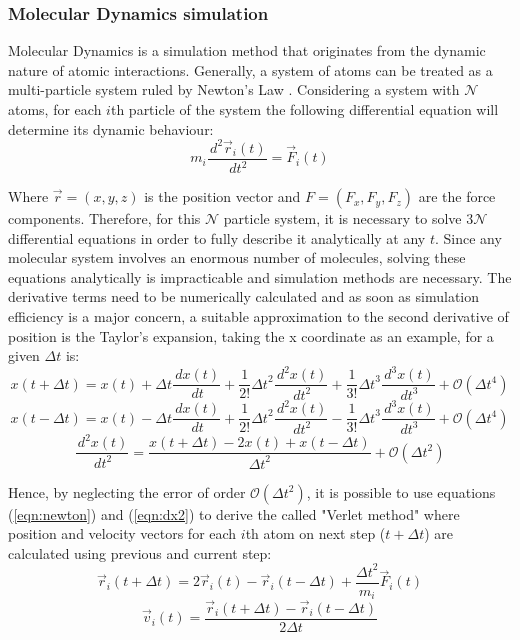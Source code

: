 \documentclass[10pt,a4paper,twoside]{article}
\begin{document}
\subsubsection{Molecular Dynamics simulation}

Molecular Dynamics is a simulation method that originates from the dynamic nature of atomic interactions. Generally, a system of atoms can be treated as a multi-particle system ruled by Newton's Law \cite{umd}. Considering a system with $\mathcal{N}$ atoms, for each $i$th particle of the system the following differential equation will determine its dynamic behaviour:
\begin{equation}
m_i\dfrac{\,d^2\vec{r}_i(t)}{\,dt^2} = \vec{F}_i(t)
\label{eqn:newton}
\end{equation}

Where $\vec{r} = (x,y,z)$ is the position vector and $F = (F_x, F_y, F_z)$ are the force components. Therefore, for this $\mathcal{N}$ particle system, it is necessary to solve $3\mathcal{N}$ differential equations in order to fully describe it analytically at any $t$. Since any molecular system involves an enormous number of molecules, solving these equations analytically is impracticable and simulation methods are necessary. The derivative terms need to be numerically calculated and as soon as simulation efficiency is a major concern, a suitable approximation to the second derivative of position is the Taylor's expansion, taking the x coordinate as an example, for a given $\Delta t$ is:
\begin{equation}
x(t+\Delta t) = x(t) + \Delta t \dfrac{\,dx(t)}{\,dt} + \dfrac{1}{2!}{\Delta t}^2 \dfrac{\,d^2x(t)}{\,dt^2} + \dfrac{1}{3!}{\Delta t}^3 \dfrac{\,d^3x(t)}{\,dt^3} +  \mathcal{O}(\Delta t^4)
\label{eqn:taylor1}
\end{equation}
\begin{equation}
x(t-\Delta t) = x(t) - \Delta t \dfrac{\,dx(t)}{\,dt} + \dfrac{1}{2!}{\Delta t}^2 \dfrac{\,d^2x(t)}{\,dt^2} - \dfrac{1}{3!}{\Delta t}^3 \dfrac{\,d^3x(t)}{\,dt^3} +  \mathcal{O}(\Delta t^4)
\label{eqn:taylor2}
\end{equation}
\begin{equation}
\dfrac{\,d^2x(t)}{\,dt^2} = \dfrac{x(t+\Delta t) - 2 x(t) + x(t-\Delta t)}{{\Delta t}^2} +  \mathcal{O}(\Delta t^2)
\label{eqn:dx2}
\end{equation}

Hence, by neglecting the error of order $\mathcal{O}(\Delta t^2)$, it is possible to use equations (\ref{eqn:newton}) and (\ref{eqn:dx2}) to derive the called "Verlet method" where position and velocity vectors for each $i$th atom on next step ($t+\Delta t$) are calculated using previous and current step:
\begin{equation}
\vec{r}_i(t+\Delta t) = 2 \vec{r}_i(t) - \vec{r}_i(t-\Delta t) + \dfrac{{\Delta t}^2}{m_i}\vec{F}_i(t)
\label{eqn:verletr}
\end{equation}
\begin{equation}
\vec{v}_i(t) =  \dfrac{\vec{r}_i(t+\Delta t) - \vec{r}_i(t-\Delta t)}{2{\Delta t}}
\label{eqn:verletv}
\end{equation}
\end{document}
